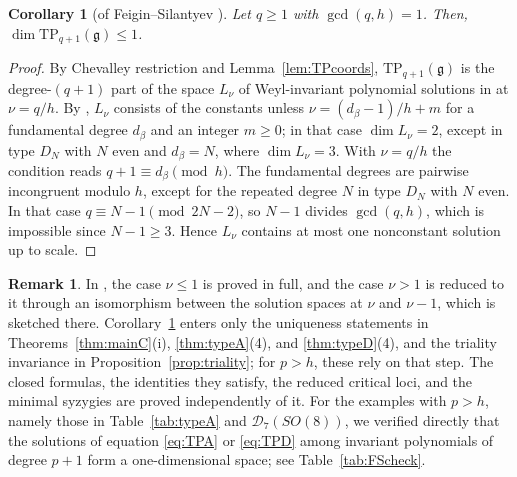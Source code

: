 \documentclass[10pt,reqno]{amsart}
\numberwithin{equation}{section}
\theoremstyle{plain}
\newtheorem{corollary}[theorem]{Corollary}
\theoremstyle{definition}
\newtheorem{remark}[theorem]{Remark}
\newcommand{\TP}{\mathrm{TP}}
\begin{document}
\begin{corollary}[of Feigin--Silantyev {\cite[Theorem~4.8 and Corollary~4.9]{FS}}]\label{thm:FS}
Let $q\ge1$ with $\gcd(q,h)=1$. Then, $\dim\TP_{q+1}(\mathfrak{g})\le1$.
\end{corollary}

\begin{proof}
By Chevalley restriction and Lemma~\ref{lem:TPcoords}, $\TP_{q+1}(\mathfrak g)$ is the degree-$(q+1)$ part of the space $L_\nu$ of Weyl-invariant polynomial solutions in \cite{FS} at $\nu=q/h$. By \cite[Theorem~4.8 and Corollary~4.9]{FS}, $L_\nu$ consists of the constants unless $\nu=(d_\beta-1)/h+m$ for a fundamental degree $d_\beta$ and an integer $m\ge0$; in that case $\dim L_\nu=2$, except in type $D_N$ with $N$ even and $d_\beta=N$, where $\dim L_\nu=3$. With $\nu=q/h$ the condition reads $q+1\equiv d_\beta\pmod h$. The fundamental degrees are pairwise incongruent modulo $h$, except for the repeated degree $N$ in type $D_N$ with $N$ even. In that case $q\equiv N-1\pmod{2N-2}$, so $N-1$ divides $\gcd(q,h)$, which is impossible since $N-1\ge3$. Hence $L_\nu$ contains at most one nonconstant solution up to scale.
\end{proof}

\begin{remark}\label{rem:FSrange}
In \cite{FS}, the case $\nu\le1$ is proved in full, and the case $\nu>1$ is reduced to it through an isomorphism between the solution spaces at $\nu$ and $\nu-1$, which is sketched there. Corollary~\ref{thm:FS} enters only the uniqueness statements in Theorems~\ref{thm:mainC}(i), \ref{thm:typeA}(4), and \ref{thm:typeD}(4), and the triality invariance in Proposition~\ref{prop:triality}; for $p>h$, these rely on that step. The closed formulas, the identities they satisfy, the reduced critical loci, and the minimal syzygies are proved independently of it. For the examples with $p>h$, namely those in Table~\ref{tab:typeA} and $\mathcal{D}_7(SO(8))$, we verified directly that the solutions of equation \eqref{eq:TPA} or \eqref{eq:TPD} among invariant polynomials of degree $p+1$ form a one-dimensional space; see Table~\ref{tab:FScheck}.
\end{remark}
\end{document}
